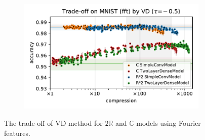 \documentclass[a4paper,10pt,onecolumn]{article}
\newcommand{\real}{\mathbb{R}}
\newcommand{\cplx}{\mathbb{C}}
\begin{document}
\begin{figure}[b]
\begin{subfigure}[b]{0.5\columnwidth}
  \end{subfigure}%
  \begin{subfigure}[b]{0.5\columnwidth}
    \centering
    \includegraphics[width=\linewidth]{figure__mnist-like__trade-off/appendix__cmp__VD__mnist__fft__-0.5.pdf}
  \end{subfigure}
  \caption{%
    The trade-off of VD method for $2\real$ and $\cplx$ models using Fourier features.
  }
  \label{fig:appendix__cmp__mnist-like__trade-off__VD__fft}
\end{figure}
\end{document}
